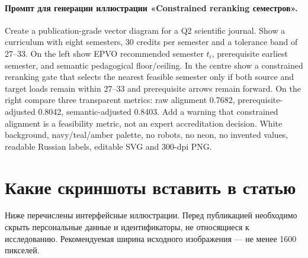\documentclass[twoside,11pt]{article}
\begin{document}
\paragraph{Промпт для генерации иллюстрации «Constrained reranking семестров».}
Create a publication-grade vector diagram for a Q2 scientific journal. Show a curriculum with eight semesters, 30 credits per semester and a tolerance band of 27--33. On the left show EPVO recommended semester $t_i$, prerequisite earliest semester, and semantic pedagogical floor/ceiling. In the centre show a constrained reranking gate that selects the nearest feasible semester only if both source and target loads remain within 27--33 and prerequisite arrows remain forward. On the right compare three transparent metrics: raw alignment 0.7682, prerequisite-adjusted 0.8042, semantic-adjusted 0.8403. Add a warning that constrained alignment is a feasibility metric, not an expert accreditation decision. White background, navy/teal/amber palette, no robots, no neon, no invented values, readable Russian labels, editable SVG and 300-dpi PNG.

\appendix

\section{Какие скриншоты вставить в статью}
\label{app:screenshots}

Ниже перечислены интерфейсные иллюстрации. Перед публикацией необходимо скрыть персональные данные и идентификаторы, не относящиеся к исследованию. Рекомендуемая ширина исходного изображения --- не менее 1600 пикселей.
\end{document}
